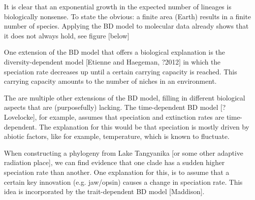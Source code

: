It is clear that an exponential growth in the expected number of lineages
is biologically nonsense. 
To state the obvious: a finite area (Earth) results in a finite number of species. 
Applying the BD model to molecular data already shows that it does not
always hold, see figure [below]

%
%
%
%
%

One extension of the BD model that offers a biological explanation is the
diversity-dependent model [Etienne and Haegeman, ?2012] in which the
speciation rate decreases up until a certain carrying capacity is reached.
This carrying capacity amounts to the number of niches in an environment.

%
%
%
%
%

The are multiple other extensions of the BD model, filling in different
biological aspects that are (purposefully) lacking. The time-dependent BD 
model [?Lovelocke], for example, assumes that speciation and extinction 
rates are time-dependent. The explanation for this would be that speciation
is mostly driven by abiotic factors, like for example, temperature,
which is known to fluctuate.


When constructing a phylogeny from Lake Tangyanika [or some
other adaptive radiation place], we can find evidence that
one clade has a sudden higher speciation rate than another.
One explanation for this, is to assume that a certain key
innovation (e.g. jaw/opsin) causes a change in speciation
rate. This idea is incorporated by the trait-dependent 
BD model [Maddison].

%
%
%

